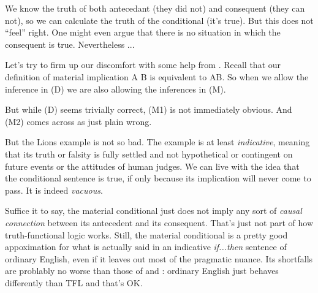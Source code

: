 We know the truth of both antecedant (they did not) and consequent (they can
not), so we can calculate the truth of the conditional (it's true). But this
does not ``feel'' right. One might even argue that there is no situation in
which the consequent is true. Nevertheless ...

Let's try to firm up our discomfort with some help from
\cite[][pp. 166-167]{Smi20}. Recall that our definition of material implication
A \eif B is equivalent to \enot A\eor B. So when we allow the
inference in (D) we are also allowing the inferences in (M).


But while (D) seems trivially correct, (M1) is not immediately obvious. And (M2)
comes across as just plain wrong.

But the Lions example is not so bad. The example is at least \emph{indicative},
meaning that its truth or falsity is fully settled and not hypothetical or
contingent on future events or the attitudes of human judges. We can live
with the idea that the conditional sentence is true, if only because its
implication will never come to pass. It is indeed \emph{vacuous}.

Suffice it to say, the material conditional just does not imply any sort of
\emph{causal connection} between its antecedent and its consequent. That's just
not part of how truth-functional logic works. Still, the material conditional
is a pretty good appoximation for what is actually said in an indicative
\emph{if...then} sentence of ordinary English, even if it leaves out most of
the pragmatic nuance. Its shortfalls are problably no worse than those of \eand
and \eor: ordinary English just behaves differently than TFL and that's OK.

